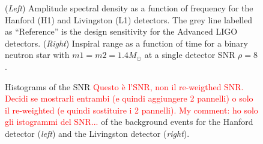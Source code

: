\documentclass[binding=0.6cm, LaM]{sapthesis}
\newcommand{\fpg}[1]{\textcolor{red}{#1} }
\begin{document}
        \begin{figure}[!t]
          \noindent
          \label{asd}
          \centering
          \caption{(\textit{Left}) Amplitude spectral density as a function of frequency for the Hanford (H1) and Livingston (L1) detectors. The grey line labelled as ``Reference'' is the design sensitivity for the Advanced LIGO detectors. (\textit{Right}) Inspiral range as a function of time for a binary neutron star with $m1 = m2 = 1.4 M_\odot$ at a single detector SNR $\rho = 8$.}
          \label{fig:asd}
        \end{figure}
        \begin{figure}[!t]
          \noindent
          \label{snrhistogram}
          \centering
          \caption{Histograms of the SNR \fpg{Questo \`e l'SNR, non il re-weigthed SNR.  Decidi se mostrarli entrambi (e quindi aggiungere 2 pannelli) o solo il re-weighted (e quindi sostituire i 2 pannelli). My comment: ho solo gli istogrammi del SNR...} of the background events for the Hanford detector (\textit{left}) and the Livingston detector (\textit{right}).}
          \label{fig:snrhistogram}
        \end{figure}
\end{document}
